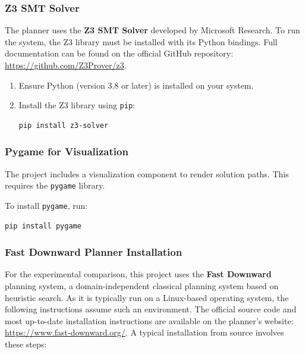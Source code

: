 \documentclass[12pt, a4paper, oneside]{report} %
\begin{document}
\subsubsection*{Z3 SMT Solver}
The planner uses the \textbf{Z3 SMT Solver} developed by Microsoft Research. To run the system, the Z3 library must be installed with its Python bindings. Full documentation can be found on the official GitHub repository: \url{https://github.com/Z3Prover/z3}.
\begin{enumerate}
    \item Ensure Python (version 3.8 or later) is installed on your system.
    \item Install the Z3 library using \texttt{pip}:
    \begin{verbatim}
pip install z3-solver
    \end{verbatim}
\end{enumerate}

\subsubsection*{Pygame for Visualization}
The project includes a visualization component to render solution paths. This requires the \texttt{pygame} library.

To install \texttt{pygame}, run:
\begin{verbatim}
pip install pygame
\end{verbatim}

\subsubsection{Fast Downward Planner Installation}
\label{sec:fd_install}

For the experimental comparison, this project uses the \textbf{Fast Downward} planning system, a domain-independent classical planning system based on heuristic search. As it is typically run on a Linux-based operating system, the following instructions assume such an environment. The official source code and most up-to-date installation instructions are available on the planner's website: \url{https://www.fast-downward.org/}. A typical installation from source involves these steps:
\end{document}
